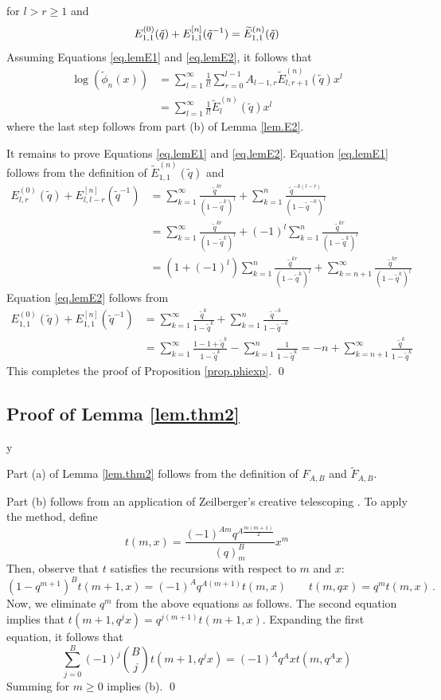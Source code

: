 \documentclass[12pt]{amsart}
\theoremstyle{definition}
\def\printname#1{
        \if\draft y
                \smash{\makebox[0pt]{\hspace{-0.5in}
                        \raisebox{8pt}{\tt\tiny #1}}}
        \fi
}
\def\lbl#1{\label{#1}\printname{#1}}
\def\ti{\widetilde}
\def\tq{\tilde{q}}
\begin{document}
for $l>r \geq 1$ and
\begin{equation}
\lbl{eq.lemE2}
E^{(0)}_{1,1}(\tq) + E^{[n]}_{1,1}(\tq^{-1})=\ti E^{(n)}_{1,1}(\tq)
\end{equation}
Assuming Equations \eqref{eq.lemE1} and \eqref{eq.lemE2}, it follows
that
\begin{align*}
\log ( \ti \phi_n(x)) &= 
\sum_{l=1}^\infty \frac{1}{l!} \sum_{r=0}^{l-1} A_{l-1,r} 
\ti E^{(n)}_{l,r+1}(\tq) x^l \\
&= \sum_{l=1}^\infty \frac{1}{l!} \ti E^{(n)}_l(\tq) x^l
\end{align*}
where the last step follows from part (b) of Lemma \ref{lem.E2}.

It remains to prove Equations \eqref{eq.lemE1} and \eqref{eq.lemE2}.
Equation \eqref{eq.lemE1} follows from the definition of $\ti E^{(n)}_{1,1}(\tq)$
and 
\begin{align*}
E^{(0)}_{l,r}(\tq) + E^{[n]}_{l,l-r}(\tq^{-1}) &=
\sum_{k=1}^\infty \frac{\tq^{kr}}{(1-\tq^k)^l} +
\sum_{k=1}^n \frac{\tq^{-k(l-r)}}{(1-\tq^{-k})^l}
\\ &
= \sum_{k=1}^\infty \frac{\tq^{kr}}{(1-\tq^k)^l} + (-1)^l
\sum_{k=1}^n  \frac{\tq^{kr}}{(1-\tq^k)^l}
\\ &
= (1+(-1)^l) \sum_{k=1}^n  \frac{\tq^{kr}}{(1-\tq^k)^l} +
\sum_{k=n+1}^\infty \frac{\tq^{kr}}{(1-\tq^k)^l}
\end{align*}
Equation \eqref{eq.lemE2} follows from
\begin{align*}
E^{(0)}_{1,1}(\tq) + E^{[n]}_{1,1}(\tq^{-1}) &= \sum_{k=1}^\infty 
\frac{\tq^k}{1-\tq^k} + \sum_{k=1}^n \frac{\tq^{-k}}{1-\tq^{-k}} \\
&=
\sum_{k=1}^\infty 
\frac{1-1+\tq^k}{1-\tq^k} -\sum_{k=1}^n \frac{1}{1-\tq^k}
= -n + \sum_{k=n+1}^\infty 
\frac{\tq^k}{1-\tq^k}
\end{align*}
This completes the proof of Proposition \ref{prop.phiexp}.
\qed

\subsection{Proof of Lemma \ref{lem.thm2}}
\lbl{sub.lem2}

Part (a) of Lemma \ref{lem.thm2} follows from the definition of $F_{A,B}$
and $\ti F_{A,B}$.

Part (b) follows from an application of Zeilberger's creative telescoping 
\cite{Z91}. To apply the method, define
$$
t(m,x)=\frac{(-1)^{A m} q^{A \frac{m(m+1)}{2}}}{(q)^B_m} x^m
$$
Then, observe that $t$ satisfies the recursions with respect to $m$
and $x$:
$$
(1-q^{m+1})^B t(m+1,x)= (-1)^A q^{A(m+1)} t(m,x) \qquad t(m,qx)=q^m t(m,x) \,.
$$
Now, we eliminate $q^m$ from the above equations as follows. The second
equation implies that $t(m+1,q^j x)=q^{j(m+1)} t(m+1,x)$. Expanding the
first equation, it follows that
$$
\sum_{j=0}^B (-1)^j \binom{B}{j} t(m+1,q^jx)=(-1)^A q^A x t(m,q^A x)
$$ 
Summing for $m \geq 0$ implies (b).
\qed
\end{document}
